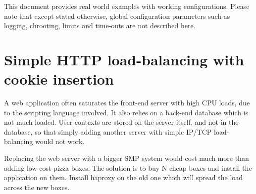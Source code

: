 This document provides real world examples with working configurations.
Please note that except stated otherwise, global configuration parameters
such as logging, chrooting, limits and time-outs are not described here.


\section{Simple HTTP load-balancing with cookie insertion}

A web application often saturates the front-end server with high CPU loads,
due to the scripting language involved. It also relies on a back-end database
which is not much loaded. User contexts are stored on the server itself, and
not in the database, so that simply adding another server with simple IP/TCP
load-balancing would not work.

\begin{figure}[!h]
  \centering

\end{figure}

Replacing the web server with a bigger SMP system would cost much more than
adding low-cost pizza boxes. The solution is to buy N cheap boxes and install
the application on them. Install haproxy on the old one which will spread the
load across the new boxes.


